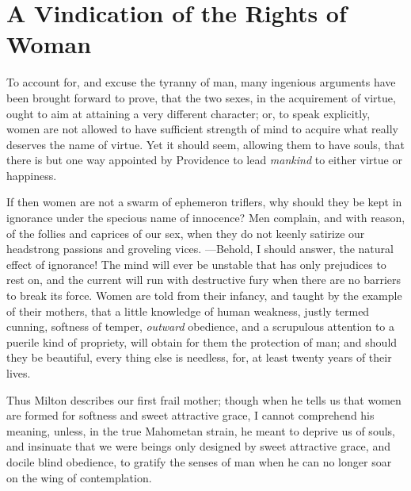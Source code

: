 
\author{Mary Wollstonecraft}
\chapter[A Vindication of the Rights of Woman, chap. 2]{A Vindication
of the Rights of Woman}


To account for, and excuse the tyranny of man, many ingenious
arguments have been brought forward to prove, that the two sexes, in
the acquirement of virtue, ought to aim at attaining a very different
character; or, to speak explicitly, women are not allowed to have
sufficient strength of mind to acquire what really deserves the name
of virtue. Yet it should seem, allowing them to have souls, that there
is but one way appointed by Providence to lead \textit{mankind} to
either virtue or happiness.

If then women are not a swarm of ephemeron triflers, why should they
be kept in ignorance under the specious name of innocence? Men
complain, and with reason, of the follies and caprices of our sex,
when they do not keenly satirize our headstrong passions and groveling
vices.  ---Be\-hold, I should answer, the natural effect of
ignorance! The mind will ever be unstable that has only prejudices to
rest on, and the current will run with destructive fury when there are
no barriers to break its force. Women are told from their infancy, and
taught by the example of their mothers, that a little knowledge of
human weakness, justly termed cunning, softness of temper,
\textit{outward} obedience, and a scrupulous attention to a puerile
kind of propriety, will obtain for them the protection of man; and
should they be beautiful, every thing else is needless, for, at least
twenty years of their lives.

Thus Milton describes our first frail mother; though when he tells us
that women are formed for softness and sweet attractive grace, I
cannot comprehend his meaning, unless, in the true Mahometan strain,
he meant to deprive us of souls, and insinuate that we were beings
only designed by sweet attractive grace, and docile blind obedience,
to gratify the senses of man when he can no longer soar on the wing of
contemplation.

